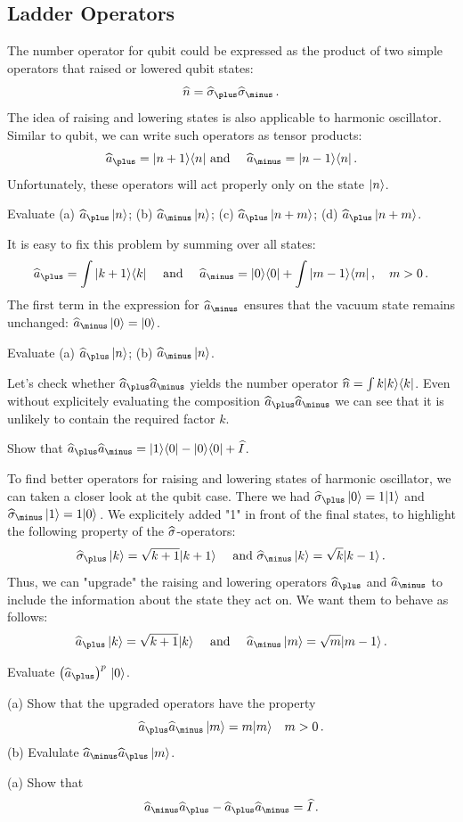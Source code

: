 \subsection{Ladder Operators}
The number operator for qubit could be expressed as the product of two simple operators that raised or lowered qubit states:
\[
\op{n} = \op{\sigma}_\plus\op{\sigma}_\minus\,.
\]
The idea of raising and lowering states is also applicable to harmonic oscillator. Similar to qubit, we can write such operators as tensor products:
\[
\op{a}_\plus = \ketbra{n+1}{n}\textrm{ and }\quad\op{a}_\minus=\ketbra{n-1}{n}\,.
\]
Unfortunately, these operators will act properly only on the state $|{n}\rangle$.
\begin{exercise}
	Evaluate (a) $\op{a}_\plus \,\ket{n}$; (b) $\op{a}_\minus \,\ket{n}$; (c) $\op{a}_\plus \,\ket{n+m}$; (d) $\op{a}_\plus \,\ket{n+m}$.
\end{exercise}
It is easy to fix this problem by summing over all states:
\[
\op{a}_\plus=\int \ketbra{k+1}{k}\quad\textrm{ and }\quad \op{a}_\minus=\ketbra{0}{0}+\int \ketbra{m-1}{m}\,,\quad m > 0\,.
\]
The first term in the expression for $\op{a}_\minus$ ensures that the vacuum state remains unchanged: $\op{a}_\minus\,\ket{0}=\ket{0}$.
\begin{exercise}
	Evaluate (a) $\op{a}_\plus \,\ket{n}$; (b) $\op{a}_\minus \,\ket{n}$.
\end{exercise}
Let's check whether $\op{a}_\plus\op{a}_\minus$ yields the number operator $\widehat{n}=\int k|{k}\rangle\langle{k}|$. Even without explicitely evaluating the composition $\op{a}_\plus\op{a}_\minus$ we can see that it is unlikely to contain the required factor $k$.
\begin{exercise}
	Show that $\op{a}_\plus\op{a}_\minus=\ketbra{1}{0}-\ketbra{0}{0}+\op{I}$.
\end{exercise}

To find better operators for raising and lowering states of harmonic oscillator, we can taken a closer look at the qubit case. There we had $\op{\sigma}_\plus\,\ket{0}=1\ket{1}$ and $\op{\sigma}_\minus\,\ket{1}=1\ket{0}$\,. We explicitely added "1" in front of the final states, to highlight the following property of the $\widehat{\sigma}$-operators:
\[
\op{\sigma}_\plus\,\ket{k}=\sqrt{k+1}\ket{k+1}\quad\textrm{ and } \op{\sigma}_\minus\,\ket{k}=\sqrt{k}\ket{k-1}\,.
\]
Thus, we can "upgrade" the raising and lowering operators $\op{a}_\plus$ and $\op{a}_\minus$ to include the information about the state they act on. We want them to behave as follows:
\[
\op{a}_\plus\,\ket{k}=\sqrt{k+1}\ket{k}\quad\textrm{ and }\quad \op{a}_\minus\,\ket{m}=\sqrt{m}\ket{m-1}\,.
\]
\begin{exercise}
	Evaluate $\left(\op{a}_\plus\right)^p\,\ket{0}$.
\end{exercise}
\begin{exercise}
	(a) Show that the upgraded operators have the property 
	\[
	\op{a}_\plus\op{a}_\minus\,\ket{m}=m\ket{m}\quad m>0\,.
	\]	
	(b) Evalulate $\op{a}_\minus\op{a}_\plus\,\ket{m}$.
\end{exercise}
\begin{exercise}
	(a) Show that 
	\[
	\op{a}_\minus\op{a}_\plus-\op{a}_\plus\op{a}_\minus=\op{I}\,.
	\]	
\end{exercise}

